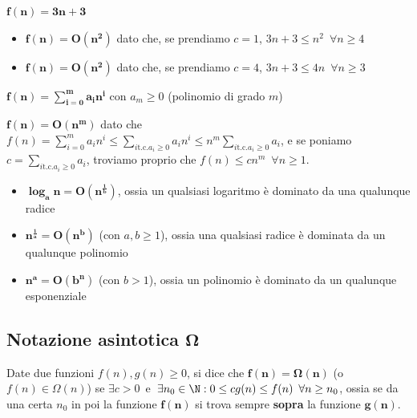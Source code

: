 \documentclass[11pt, a4paper, titlepage, oneside]{scrbook}
\begin{document}
\Esempi \nopagebreak

$\bm{f(n) = 3n + 3}$ \nopagebreak
\begin{itemize}
    \item $\bm{f(n) = \textbf{O}(n^2)}$ dato che, se prendiamo $c = 1$, $3n + 3 \leq n^2 \enspace \forall n \geq 4$
    \item $\bm{f(n) = \textbf{O}(n^2)}$ dato che, se prendiamo $c = 4$, $3n + 3 \leq 4n \enspace \forall n \geq 3$
\end{itemize}

\Separatore

$\bm{f(n) = \sum_{i = 0}^m a_i n^i}$ con $a_m \geq 0$ (polinomio di grado $m$) \nopagebreak

$\bm{f(n) = \textbf{O}(n^m)}$ dato che $f(n) = \sum_{i = 0}^m a_i n^i \leq \sum_{i \text{t.c.} a_i \geq 0} a_i n^i \leq n^m \sum_{i \text{t.c.} a_i \geq 0} a_i$, e se poniamo $c = \sum_{i  \text{t.c.} a_i \geq 0} a_i$, troviamo proprio che $f(n) \leq c n^m \enspace \forall n \geq 1$. 

\begin{Proprieta}
\label{prop-regole-generali-O}
\begin{itemize}
    \item $\bm{\log_a n = \textbf{O}(n^{\frac{1}{b}})}$, ossia un qualsiasi logaritmo è dominato da una qualunque radice
    \item $\bm{n^{\frac{1}{a}} = \textbf{O}(n^b)}$ (con $a,b \geq 1$), ossia una qualsiasi radice è dominata da un qualunque polinomio
    \item $\bm{n^a = \textbf{O}(b^n)}$ (con $b > 1$), ossia un polinomio è dominato da un qualunque esponenziale
\end{itemize}
\end{Proprieta}

\subsection{Notazione asintotica \texorpdfstring{$\bm{\Omega}$}{}}

\begin{Definizione}
\label{def-notazione-asintotica-Omega}
Date due funzioni $f(n), g(n) \geq 0$, si dice che $\bm{f(n) = \Omega(n)}$ (o $f(n) \in \Omega(n)$) se \mbox{$\exists c > 0$ e $\exists n_0 \in \N: 0 \leq c g(n) \leq f(n) \enspace \forall n \geq n_0$}, ossia se da una certa $n_0$ in poi la funzione $\bm{f(n)}$ si trova sempre \textbf{sopra} la funzione $\bm{g(n)}$.
\end{Definizione}
\end{document}
